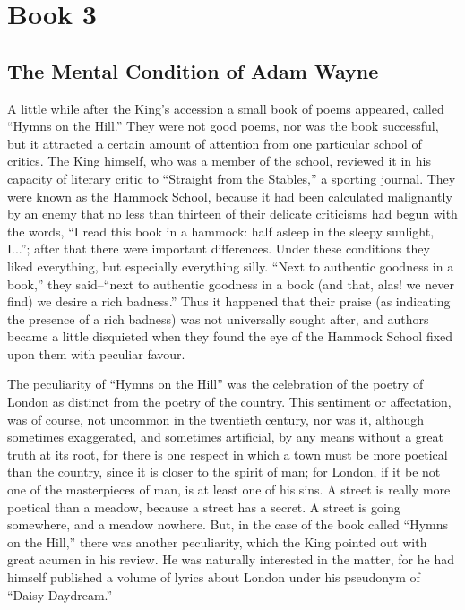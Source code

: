 \documentclass{book}
\begin{document}
\setcounter{chapter}{0}\part*{Book 3}
\label{chapter-8}
\chapter{The Mental Condition of Adam Wayne}
\label{chapter-9}
A little while after the King’s accession a small book of poems appeared, called “Hymns on the Hill.” They were not good poems, nor was the book successful, but it attracted a certain amount of attention from one particular school of critics. The King himself, who was a member of the school, reviewed it in his capacity of literary critic to “Straight from the Stables,” a sporting journal. They were known as the Hammock School, because it had been calculated malignantly by an enemy that no less than thirteen of their delicate criticisms had begun with the words, “I read this book in a hammock: half asleep in the sleepy sunlight, I...”; after that there were important differences. Under these conditions they liked everything, but especially everything silly. “Next to authentic goodness in a book,” they said–“next to authentic goodness in a book (and that, alas! we never find) we desire a rich badness.” Thus it happened that their praise (as indicating the presence of a rich badness) was not universally sought after, and authors became a little disquieted when they found the eye of the Hammock School fixed upon them with peculiar favour.

The peculiarity of “Hymns on the Hill” was the celebration of the poetry of London as distinct from the poetry of the country. This sentiment or affectation, was of course, not uncommon in the twentieth century, nor was it, although sometimes exaggerated, and sometimes artificial, by any means without a great truth at its root, for there is one respect in which a town must be more poetical than the country, since it is closer to the spirit of man; for London, if it be not one of the masterpieces of man, is at least one of his sins. A street is really more poetical than a meadow, because a street has a secret. A street is going somewhere, and a meadow nowhere. But, in the case of the book called “Hymns on the Hill,” there was another peculiarity, which the King pointed out with great acumen in his review. He was naturally interested in the matter, for he had himself published a volume of lyrics about London under his pseudonym of “Daisy Daydream.”
\end{document}
